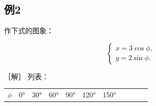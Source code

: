 \subsection{例2}\label{ux4f8b2-40}

作下式的图象：

\[
\left\{ \begin{array}{l} x = 3 \cos \phi, \\ y = 2 \sin \phi. \end{array} \right.
\]

［解］ 列表：

{\def\LTcaptype{none} %
\begin{longtable}[]{@{}
  >{\raggedright\arraybackslash}p{}
  >{\raggedright\arraybackslash}p{}
  >{\raggedright\arraybackslash}p{}
  >{\raggedright\arraybackslash}p{}
  >{\raggedright\arraybackslash}p{}
  >{\raggedright\arraybackslash}p{}
  >{\raggedright\arraybackslash}p{}
  >{\raggedright\arraybackslash}p{}
  >{\raggedright\arraybackslash}p{}
  >{\raggedright\arraybackslash}p{}
  >{\raggedright\arraybackslash}p{}@{}}
\toprule\noalign{}
\begin{minipage}[b]{\linewidth}\raggedright
\(\phi\)
\end{minipage} & \begin{minipage}[b]{\linewidth}\raggedright
0°
\end{minipage} & \begin{minipage}[b]{\linewidth}\raggedright
30°
\end{minipage} & \begin{minipage}[b]{\linewidth}\raggedright
60°
\end{minipage} & \begin{minipage}[b]{\linewidth}\raggedright
90°
\end{minipage} & \begin{minipage}[b]{\linewidth}\raggedright
120°
\end{minipage} & \begin{minipage}[b]{\linewidth}\raggedright
150°
\end{minipage} & \begin{minipage}[b]{\linewidth}\raggedright

\end{minipage}
\end{longtable}}
